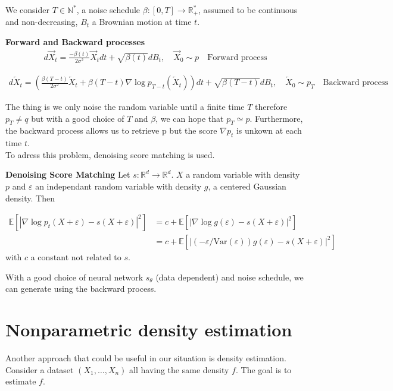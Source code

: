 \documentclass{article}
\begin{document}
\bigskip

We consider \(T\in\mathbb{N}^{*}\), a noise schedule \(\beta:[0,T]\rightarrow \mathbb{R}_{+}^{*}\), assumed to be continuous and non-decreasing, \(B_t\) a Brownian motion at time \(t\).

\textbf{Forward and Backward processes}
\begin{align}
    d\overrightarrow{X}_t = \frac{-\beta(t)}{2\sigma^2}\overrightarrow{X}_t dt + \sqrt{\beta(t)}dB_t, \quad \overrightarrow{X}_0\sim p 
    \quad \text{Forward process}
\end{align} 

\begin{align}
    d\overleftarrow{X}_t=\left(  \frac{\beta(T-t)}{2\sigma^2}\overleftarrow{X}_t+\beta(T-t)\nabla\log p_{T-t}\left(\overleftarrow{X}_t \right)  \right)dt + \sqrt{\beta(T-t)}dB_t, \quad \overleftarrow{X}_0\sim p_T \quad \text{Backward process}
\end{align}

The thing is we only noise the random variable until a finite time \(T\) therefore \(p_T\not= q\) but with a good choice of \(T\) and \(\beta\), we can hope that \(p_T\simeq p\). Furthermore, the backward process allows us to retrieve p but the score \(\nabla p_t\) is unkown at each time \(t\). \\
To adress this problem, denoising score matching is used.  

\bigskip
\textbf{Denoising Score Matching} \newline
Let \(s:\mathbb{R}^d\rightarrow\mathbb{R}^d\). \(X\) a random variable with density \(p\) and \(\varepsilon\) an independant random variable with density \(g\), a centered Gaussian density. Then 

\begin{align}
    \mathbb{E}[|\nabla \log p_t (X+\varepsilon)-s(X+\varepsilon)|^2]&=c+\mathbb{E}[|\nabla \log g(\varepsilon)-s(X+\varepsilon)|^2]\\
    &=c+\mathbb{E}[|(-\varepsilon/\text{Var} (\varepsilon))g(\varepsilon)-s(X+\varepsilon)|^2]
\end{align}
with \(c\) a constant not related to \(s\).

With a good choice of neural network \(s_\theta\) (data dependent) and noise schedule, we can generate using the backward process.


\section{Nonparametric density estimation}
Another approach that could be useful in our situation is density estimation. Consider a dataset \((X_1,\ldots,X_n)\) all having the same density \(f\). The goal is to estimate \(f\). 
\end{document}
